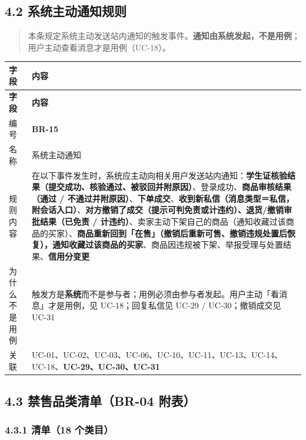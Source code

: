 \documentclass[12pt,a4paper]{ctexart}
\begin{document}
\subsection*{4.2 系统主动通知规则}

\begin{quote}\small
本条规定系统主动发送站内通知的触发事件。\textbf{通知由系统发起，不是用例}；用户主动查看消息才是用例（UC-18）。

\end{quote}

{\footnotesize
\begin{longtable}{|p{2.75cm}|p{13.25cm}|}
\hline
\textbf{字段} & \textbf{内容} \\
\hline
\endfirsthead
\hline
\textbf{字段} & \textbf{内容} \\
\hline
\endhead
\hline
\endfoot
编号 & \textbf{BR-15} \\
\hline
名称 & 系统主动通知 \\
\hline
规则内容 & 在以下事件发生时，系统应主动向相关用户发送站内通知：\textbf{学生证核验结果（提交成功、核验通过、被驳回并附原因）}、登录成功、\textbf{商品审核结果（通过 / 不通过并附原因）}、\textbf{下单成交}、\textbf{收到新私信（消息类型＝私信，附会话入口）}、\textbf{对方撤销了成交（提示可判免责或计违约）、退货/撤销审批结果（已免责 / 计违约）}、卖家主动下架自己的商品（通知收藏过该商品的买家）、\textbf{商品重新回到「在售」（撤销后重新可售、撤销违规处置后恢复），通知收藏过该商品的买家}、商品因违规被下架、举报受理与处置结果、\textbf{信用分变更} \\
\hline
为什么不是用例 & 触发方是\textbf{系统}而不是参与者；用例必须由参与者发起。用户主动「看消息」才是用例，见 UC-18；回复私信见 UC-29 / UC-30；撤销成交见 UC-31 \\
\hline
关联 & UC-01、UC-02、UC-03、UC-06、UC-10、UC-11、UC-13、UC-14、UC-18、\textbf{UC-29、UC-30、UC-31} \\
\hline
\end{longtable}
}



\subsection*{4.3 禁售品类清单（BR-04 附表）}


\subsubsection*{4.3.1 清单（18 个类目）}
\end{document}
